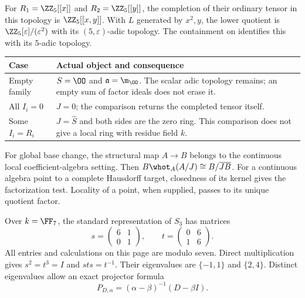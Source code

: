 For $R_1=\ZZ_5[[x]]$ and $R_2=\ZZ_5[[y]]$, the completion of their ordinary tensor in this topology is $\ZZ_5[[x,y]]$. With $L$ generated by $x^2,y$, the lower quotient is $\ZZ_5[\varepsilon]/(\varepsilon^2)$ with its $(5,\varepsilon)$-adic topology. The containment on  identifies this with its $5$-adic topology.

\begin{center}\small
\begin{tabularx}{\linewidth}{@{}p{.22\linewidth}Y@{}}\toprule
Case & Actual object and consequence\\\midrule
Empty family & $S=\OO$ and $\mathfrak a=\m_\OO$. The scalar adic topology remains; an empty sum of factor ideals does not erase it.\\
All $I_i=0$ & $J=0$; the comparison returns the completed tensor itself.\\
Some $I_i=R_i$ & $J=\widehat S$ and both sides are the zero ring. This comparison does not give a local ring with residue field $k$.\\\bottomrule
\end{tabularx}
\end{center}

For global base change, the structural map $A\to B$ belongs to the continuous local coefficient-algebra setting. Then $B\whot_A(A/J)\cong B/\overline{JB}$. For a continuous algebra point to a complete Hausdorff target, closedness of its kernel gives the factorization test. Locality of a point, when supplied, passes to its unique quotient factor.


Over $k=\FF_7$, the standard representation of $S_3$ has matrices
\[
 s=\begin{pmatrix}6&1\\0&1\end{pmatrix},\qquad
 t=\begin{pmatrix}0&6\\1&6\end{pmatrix}.
\]
All entries and calculations on this page are modulo seven. Direct multiplication gives $s^2=t^3=I$ and $sts=t^{-1}$. Their eigenvalues are $\{-1,1\}$ and $\{2,4\}$. Distinct eigenvalues allow an exact projector formula
\[
P_{D,\alpha}=(\alpha-\beta)^{-1}(D-\beta I).
\]

